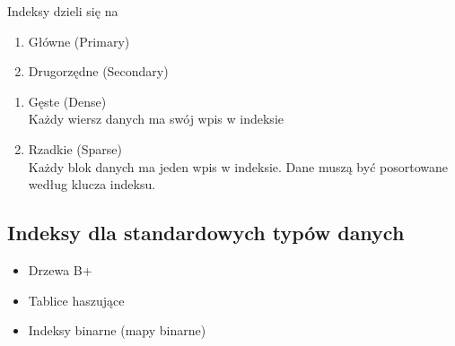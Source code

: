 \documentclass[main.tex]{subfiles}
\begin{document}
    Indeksy dzieli się na
    \begin{enumerate}
        \item Główne (Primary)
        \item Drugorzędne (Secondary)
    \end{enumerate}

    \begin{enumerate}
        \item Gęste (Dense)\\
        Każdy wiersz danych ma swój wpis w indeksie
        \item Rzadkie (Sparse)\\
        Każdy blok danych ma jeden wpis w indeksie. Dane muszą być posortowane według klucza indeksu.
    \end{enumerate}

    \subsection{Indeksy dla standardowych typów danych}
    \begin{itemize}
        \item Drzewa B+
        \item Tablice haszujące
        \item Indeksy binarne (mapy binarne)
    \end{itemize}
\end{document}
